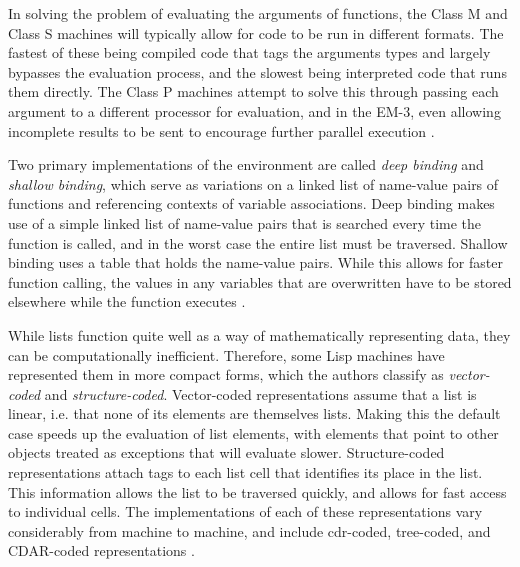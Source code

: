 \documentclass[journal]{IEEEtran}
\begin{document}
In solving the problem of evaluating the arguments of functions, the Class M and Class S machines will typically allow for code to be run in different formats. The fastest of these being compiled code that tags the arguments types and largely bypasses the evaluation process, and the slowest being interpreted code that runs them directly. The Class P machines attempt to solve this through passing each argument to a different processor for evaluation, and in the EM-3, even allowing incomplete results to be sent to encourage further parallel execution \cite{pt, yamaguchi}.

Two primary implementations of the environment are called \textit{deep binding} and \textit{shallow binding}, which serve as variations on a linked list of name-value pairs of functions and referencing contexts of variable associations. Deep binding makes use of a simple linked list of name-value pairs that is searched every time the function is called, and in the worst case the entire list must be traversed. Shallow binding uses a table that holds the name-value pairs. While this allows for faster function calling, the values in any variables that are overwritten have to be stored elsewhere while the function executes \cite{pt}.

While lists function quite well as a way of mathematically representing data, they can be computationally inefficient. Therefore, some Lisp machines have represented them in more compact forms, which the authors classify as \textit{vector-coded} and \textit{structure-coded}. Vector-coded representations assume that a list is linear, i.e. that none of its elements are themselves lists. Making this the default case speeds up the evaluation of list elements, with elements that point to other objects treated as exceptions that will evaluate slower. Structure-coded representations attach tags to each list cell that identifies its place in the list. This information allows the list to be traversed quickly, and allows for fast access to individual cells. The implementations of each of these representations vary considerably from machine to machine, and include cdr-coded, tree-coded, and CDAR-coded representations \cite{pt}.
\end{document}
